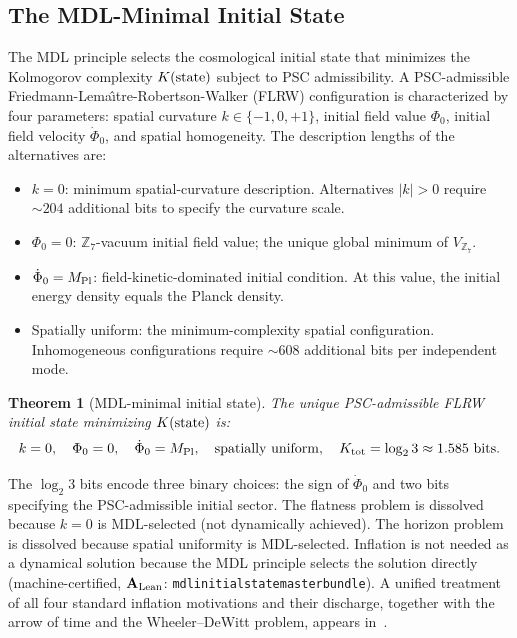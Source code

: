 \documentclass[11pt]{article}
\newtheorem{theorem}{Theorem}[section]
\theoremstyle{remark}
\newcommand{\ZS}{\mathbb{Z}_7}
\newcommand{\lean}[1]{%
  \penalty-100
  \begingroup\def\_{\textunderscore\allowbreak}\texttt{#1}\endgroup}
\newcommand{\MPl}{M_{\rm Pl}}
\newcommand{\CatAL}{\ensuremath{\textbf{A}_{\rm Lean}}}
\begin{document}
\subsection{The MDL-Minimal Initial State}
\label{sec:ic}

The MDL principle selects the cosmological initial state that minimizes the Kolmogorov
complexity $K({\rm state})$ subject to PSC admissibility.  A PSC-admissible Friedmann-Lema\^{\i}tre-Robertson-Walker (FLRW)
configuration is characterized by four parameters: spatial curvature $k\in\{-1,0,+1\}$,
initial field value $\Phi_0$, initial field velocity $\dot\Phi_0$, and spatial
homogeneity.  The description lengths of the alternatives are:
\begin{itemize}[noitemsep]
\item $k = 0$: minimum spatial-curvature description.  Alternatives $|k|>0$ require
  $\sim 204$ additional bits to specify the curvature scale.
\item $\Phi_0 = 0$: $\ZS$-vacuum initial field value; the unique global minimum of $V_{\ZS}$.
\item $\dot\Phi_0 = \MPl$: field-kinetic-dominated initial condition.  At this value, the
  initial energy density equals the Planck density.
\item Spatially uniform: the minimum-complexity spatial configuration.  Inhomogeneous
  configurations require $\sim 608$ additional bits per independent mode.
\end{itemize}

\begin{theorem}[MDL-minimal initial state]
\label{thm:ic}
The unique PSC-admissible FLRW initial state minimizing $K({\rm state})$ is:
\begin{equation}
  k = 0, \quad \Phi_0 = 0, \quad \dot\Phi_0 = \MPl, \quad \text{spatially uniform},
  \quad K_{\rm tot} = \log_2 3 \approx 1.585~\text{bits}.
  \label{eq:IC}
\end{equation}
\end{theorem}

The $\log_2 3$ bits encode three binary choices: the sign of $\dot\Phi_0$ and two bits
specifying the PSC-admissible initial sector.  The flatness problem is dissolved because
$k=0$ is MDL-selected (not dynamically achieved).  The horizon problem is dissolved
because spatial uniformity is MDL-selected.  Inflation is not
needed as a dynamical solution because the MDL principle selects the solution directly
(machine-certified, $\CatAL$: \lean{mdl\_initial\_state\allowbreak\_master\_bundle}).
A unified treatment of all four standard inflation motivations and their discharge,
together with the arrow of time and the Wheeler--DeWitt problem, appears
in~\cite{SpivackGTECompleteFramework}.
\end{document}
